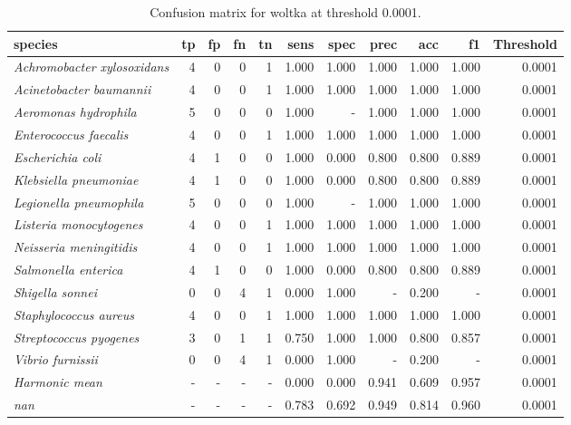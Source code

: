 \begin{table}[H]
\centering
\begin{tabular}{lrrrrrrrrrr}
\hline
\textbf{species} & \textbf{tp} & \textbf{fp} & \textbf{fn} & \textbf{tn} & \textbf{sens} & \textbf{spec} & \textbf{prec} & \textbf{acc} & \textbf{f1} & \textbf{Threshold} \\
\hline
\itshape Achromobacter xylosoxidans & 4 & 0 & 0 & 1 & 1.000 & 1.000 & 1.000 & 1.000 & 1.000 & 0.0001 \\
\itshape Acinetobacter baumannii & 4 & 0 & 0 & 1 & 1.000 & 1.000 & 1.000 & 1.000 & 1.000 & 0.0001 \\
\itshape Aeromonas hydrophila & 5 & 0 & 0 & 0 & 1.000 & - & 1.000 & 1.000 & 1.000 & 0.0001 \\
\itshape Enterococcus faecalis & 4 & 0 & 0 & 1 & 1.000 & 1.000 & 1.000 & 1.000 & 1.000 & 0.0001 \\
\itshape Escherichia coli & 4 & 1 & 0 & 0 & 1.000 & 0.000 & 0.800 & 0.800 & 0.889 & 0.0001 \\
\itshape Klebsiella pneumoniae & 4 & 1 & 0 & 0 & 1.000 & 0.000 & 0.800 & 0.800 & 0.889 & 0.0001 \\
\itshape Legionella pneumophila & 5 & 0 & 0 & 0 & 1.000 & - & 1.000 & 1.000 & 1.000 & 0.0001 \\
\itshape Listeria monocytogenes & 4 & 0 & 0 & 1 & 1.000 & 1.000 & 1.000 & 1.000 & 1.000 & 0.0001 \\
\itshape Neisseria meningitidis & 4 & 0 & 0 & 1 & 1.000 & 1.000 & 1.000 & 1.000 & 1.000 & 0.0001 \\
\itshape Salmonella enterica & 4 & 1 & 0 & 0 & 1.000 & 0.000 & 0.800 & 0.800 & 0.889 & 0.0001 \\
\itshape Shigella sonnei & 0 & 0 & 4 & 1 & 0.000 & 1.000 & - & 0.200 & - & 0.0001 \\
\itshape Staphylococcus aureus & 4 & 0 & 0 & 1 & 1.000 & 1.000 & 1.000 & 1.000 & 1.000 & 0.0001 \\
\itshape Streptococcus pyogenes & 3 & 0 & 1 & 1 & 0.750 & 1.000 & 1.000 & 0.800 & 0.857 & 0.0001 \\
\itshape Vibrio furnissii & 0 & 0 & 4 & 1 & 0.000 & 1.000 & - & 0.200 & - & 0.0001 \\
\itshape Harmonic mean & - & - & - & - & 0.000 & 0.000 & 0.941 & 0.609 & 0.957 & 0.0001 \\
\itshape nan & - & - & - & - & 0.783 & 0.692 & 0.949 & 0.814 & 0.960 & 0.0001 \\
\end{tabular}
\caption{Confusion matrix for woltka at threshold 0.0001.}
\label{tab:conf_woltka_0.0001}
\end{table}
